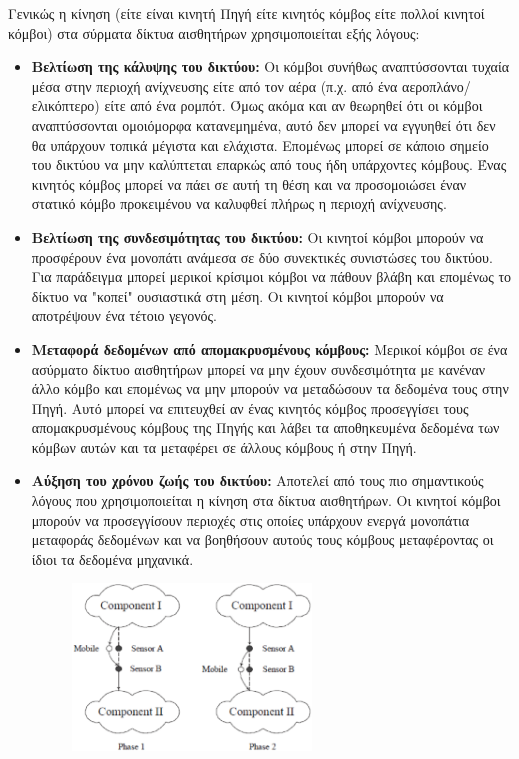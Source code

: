 Γενικώς η κίνηση (είτε είναι κινητή Πηγή είτε κινητός κόμβος είτε πολλοί κινητοί κόμβοι) στα σύρματα δίκτυα αισθητήρων χρησιμοποιείται εξής λόγους:

\begin{itemize}
\item \textbf{Βελτίωση της κάλυψης του δικτύου:} Οι κόμβοι συνήθως αναπτύσσονται τυχαία μέσα στην περιοχή ανίχνευσης είτε από τον αέρα (π.χ. από ένα
αεροπλάνο/ελικόπτερο) είτε από ένα ρομπότ. Όμως ακόμα και αν θεωρηθεί ότι οι κόμβοι αναπτύσσονται ομοιόμορφα κατανεμημένα, αυτό δεν μπορεί να εγγυηθεί ότι δεν θα
υπάρχουν τοπικά μέγιστα και ελάχιστα. Επομένως μπορεί σε κάποιο σημείο του δικτύου να μην καλύπτεται επαρκώς από τους ήδη υπάρχοντες κόμβους. Ένας κινητός κόμβος
μπορεί να πάει σε αυτή τη θέση και να προσομοιώσει έναν στατικό κόμβο προκειμένου να καλυφθεί πλήρως η περιοχή ανίχνευσης.
\item \textbf{Βελτίωση της συνδεσιμότητας του δικτύου:} Οι κινητοί κόμβοι μπορούν να προσφέρουν ένα μονοπάτι ανάμεσα σε δύο συνεκτικές συνιστώσες του δικτύου. Για
παράδειγμα μπορεί μερικοί κρίσιμοι κόμβοι να πάθουν βλάβη και επομένως το δίκτυο να "κοπεί" ουσιαστικά στη μέση. Οι κινητοί κόμβοι μπορούν να αποτρέψουν ένα τέτοιο
γεγονός.
\item \textbf{Μεταφορά δεδομένων από απομακρυσμένους κόμβους:} Μερικοί κόμβοι σε ένα ασύρματο δίκτυο αισθητήρων μπορεί να μην έχουν συνδεσιμότητα με κανέναν άλλο
κόμβο και επομένως να μην μπορούν να μεταδώσουν τα δεδομένα τους στην Πηγή. Αυτό μπορεί να επιτευχθεί αν ένας κινητός κόμβος προσεγγίσει τους απομακρυσμένους κόμβους
της Πηγής και λάβει τα αποθηκευμένα δεδομένα των κόμβων αυτών και τα μεταφέρει σε άλλους κόμβους ή στην Πηγή.
\item \textbf{Αύξηση του χρόνου ζωής του δικτύου:} Αποτελεί από τους πιο σημαντικούς λόγους που χρησιμοποιείται η κίνηση στα δίκτυα αισθητήρων. Οι κινητοί κόμβοι
μπορούν να προσεγγίσουν περιοχές στις οποίες υπάρχουν ενεργά μονοπάτια μεταφοράς δεδομένων και να βοηθήσουν αυτούς τους κόμβους μεταφέροντας οι ίδιοι τα δεδομένα
μηχανικά.
\begin{figure}[h]
	\centering
	\includegraphics[width=0.6\textwidth]{images/mobile_help.eps}

\end{figure}
\end{itemize}
